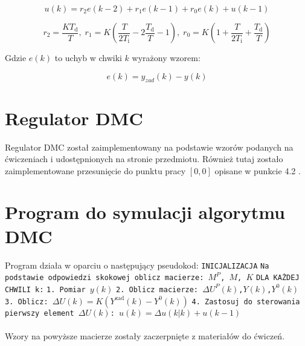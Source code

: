     \begin{equation}
        u(k)=r_2e(k-2)+r_1e(k-1)+r_0e(k)+u(k-1)
    \end{equation}
    
    \begin{equation}
        r_2=\frac{KT_{\mathrm{d}}}{T},\; 
        r_1=K(\frac{T}{2T_{\mathrm{i}}}
            -2\frac{T_{\mathrm{d}}}{T}
            -1),\; 
        r_0=K(1+\frac{T}{2T_{\mathrm{i}}}
            +\frac{T_{\mathrm{d}}}{T})
    \end{equation}   
    
    Gdzie $e(k)$ to uchyb w chwiki $k$ wyrażony wzorem:
    
    \begin{equation}
       e(k)=y_{zad}(k)-y(k)
    \end{equation}
    
    \section{Regulator DMC}
    Regulator DMC został zaimplementowany na podstawie wzorów podanych na ćwiczeniach i udostępnionych na stronie przedmiotu.
    \newline
    Również tutaj zostało zaimplementowane przesunięcie do punktu pracy $[0,0]$ opisane w punkcie 4.2 .
    
    \section{Program do symulacji algorytmu DMC}
    Program działa w oparciu o następujący pseudokod:\newline\newline
    \texttt{INICJALIZACJA}\newline
    \texttt{Na podstawie odpowiedzi skokowej oblicz macierze: $M^P$, $M$, $K$}\newline\newline
    \texttt{DLA KAŻDEJ CHWILI k:}\newline
    \texttt{1. Pomiar $y(k)$}\newline
    \texttt{2. Oblicz macierze: $\Delta{U^P(k)}$,$Y(k)$,$Y^0(k)$}\newline
    \texttt{3. Oblicz: $\Delta{U(k)}=K(Y^{\mathrm{zad}}(k)-Y^0(k))$}\newline
    \texttt{4. Zastosuj do sterowania pierwszy element $\Delta{U(k)}$: $u(k)=\Delta{u}(k|k)+u(k-1)$}\newline
    \paragraph{}
    Wzory na powyższe macierze zostały zaczerpnięte z materiałów do ćwiczeń.
    
    
   
    
